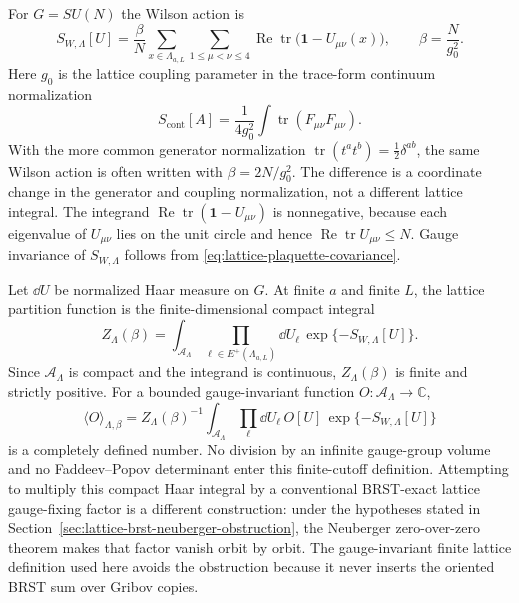 For \(G=SU(N)\) the Wilson action is
\begin{equation}
  S_{W,\Lambda}[U]
  =
  \frac{\beta}{N}
  \sum_{x\in\Lambda_{a,L}}
  \sum_{1\leq\mu<\nu\leq 4}
	  \operatorname{Re}\operatorname{tr}
	  \bigl(\mathbf 1-U_{\mu\nu}(x)\bigr),
	  \qquad
	  \beta=\frac{N}{g_0^2}.
	  \label{eq:lattice-wilson-action}
\end{equation}
Here \(g_0\) is the lattice coupling parameter in the trace-form continuum
normalization
\[
  S_{\mathrm{cont}}[A]
  =
  \frac1{4g_0^2}\int\operatorname{tr}(F_{\mu\nu}F_{\mu\nu}) .
\]
With the more common generator normalization
\(\operatorname{tr}(t^a t^b)=\frac12\delta^{ab}\), the same Wilson action is
often written with \(\beta=2N/g_0^2\).  The difference is a coordinate change in
the generator and coupling normalization, not a different lattice integral.
The integrand
\(\operatorname{Re}\operatorname{tr}(\mathbf 1-U_{\mu\nu})\) is nonnegative,
because each eigenvalue of \(U_{\mu\nu}\) lies on the unit circle and hence
\(\operatorname{Re}\operatorname{tr}U_{\mu\nu}\leq N\).  Gauge invariance of
\(S_{W,\Lambda}\) follows from
\eqref{eq:lattice-plaquette-covariance}.

Let \(\dd U\) be normalized Haar measure on \(G\).  At finite \(a\) and finite
\(L\), the lattice partition function is the finite-dimensional compact
integral
\begin{equation}
  Z_{\Lambda}(\beta)
  =
  \int_{\mathcal A_{\Lambda}}
  \prod_{\ell\in E^+(\Lambda_{a,L})}\dd U_\ell\,
  \exp\{-S_{W,\Lambda}[U]\}.
  \label{eq:lattice-partition-function}
\end{equation}
Since \(\mathcal A_{\Lambda}\) is compact and the integrand is continuous,
\(Z_{\Lambda}(\beta)\) is finite and strictly positive.  For a bounded
gauge-invariant function \(O:\mathcal A_{\Lambda}\to\mathbb C\),
\begin{equation}
  \langle O\rangle_{\Lambda,\beta}
  =
  Z_{\Lambda}(\beta)^{-1}
  \int_{\mathcal A_{\Lambda}}
  \prod_{\ell}\dd U_\ell\,
  O[U]\,\exp\{-S_{W,\Lambda}[U]\}
  \label{eq:lattice-expectation}
\end{equation}
is a completely defined number.  No division by an infinite gauge-group volume
and no Faddeev--Popov determinant enter this finite-cutoff definition.
Attempting to multiply this compact Haar integral by a conventional
BRST-exact lattice gauge-fixing factor is a different construction: under the
hypotheses stated in
Section~\ref{sec:lattice-brst-neuberger-obstruction}, the Neuberger
zero-over-zero theorem makes that factor vanish orbit by orbit.  The
gauge-invariant finite lattice definition used here avoids the obstruction
because it never inserts the oriented BRST sum over Gribov copies.

